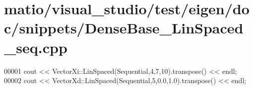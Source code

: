 \hypertarget{matio_2visual__studio_2test_2eigen_2doc_2snippets_2_dense_base___lin_spaced__seq_8cpp_source}{}\section{matio/visual\+\_\+studio/test/eigen/doc/snippets/\+Dense\+Base\+\_\+\+Lin\+Spaced\+\_\+seq.cpp}
\label{matio_2visual__studio_2test_2eigen_2doc_2snippets_2_dense_base___lin_spaced__seq_8cpp_source}

\begin{DoxyCode}
00001 cout << VectorXi::LinSpaced(Sequential,4,7,10).transpose() << endl;
00002 cout << VectorXd::LinSpaced(Sequential,5,0.0,1.0).transpose() << endl;
\end{DoxyCode}
